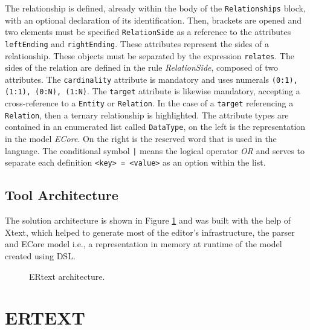 \documentclass[a4paper,twoside,anonymous]{article}
\begin{document}
The relationship is defined, already within the body of the \texttt{Relationships} block, with an optional declaration of its identification.
Then, brackets are opened and two elements must be specified \texttt{RelationSide} as a reference to the attributes \texttt{leftEnding} and \texttt{rightEnding}.
These attributes represent the sides of a relationship.
These objects must be separated by the expression \texttt{relates}.
The sides of the relation are defined in the rule \textit{RelationSide}, composed of two attributes.
The \texttt{cardinality} attribute is mandatory and uses numerals \texttt{(0:1), (1:1), (0:N), (1:N)}.
The \texttt{target} attribute is likewise mandatory, accepting a cross-reference to a \texttt{Entity} or \texttt{Relation}.
In the case of a \texttt{target} referencing a \texttt{Relation}, then a ternary relationship is highlighted.
The attribute types are contained in an enumerated list called \texttt{DataType}, on the left is the representation in the model \textit{ECore}.
On the right is the reserved word that is used in the language.
The conditional symbol \texttt{|} means the logical operator \textit{OR} and serves to separate each definition \texttt{<key> = <value>} as an option within the list.

\subsection{Tool Architecture} \label{sec:arqDSL}

The solution architecture is shown in Figure \ref{fig:arqXtext} and was built with the help of Xtext, which helped to generate most of the editor's infrastructure, the parser and ECore model i.e., a representation in memory at runtime of the model created using DSL.

\begin{figure}[!htb]
    \centering
    
    \caption{ERtext architecture.}
    \label{fig:arqXtext}
\end{figure}

\section{\uppercase{ERText}}
\label{sec:ertextTool}
\end{document}

